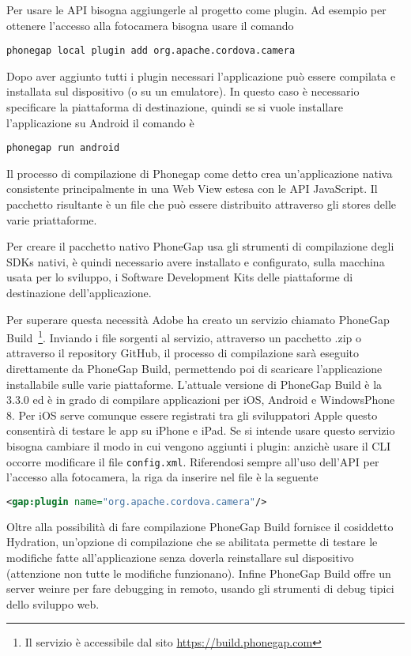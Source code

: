 			Per usare le API bisogna aggiungerle al progetto come plugin. Ad 
			esempio per ottenere l'accesso alla fotocamera bisogna usare il comando 
	\begin{lstlisting}[language=MyBash]
	phonegap local plugin add org.apache.cordova.camera
	\end{lstlisting}
	
			Dopo aver aggiunto tutti i plugin necessari l'applicazione può 
			essere compilata e installata sul dispositivo (o su un emulatore).
			In questo caso è necessario specificare la piattaforma di destinazione, 
			quindi se si vuole installare l'applicazione su Android il comando è 
	\begin{lstlisting}[language=MyBash]
	phonegap run android
	\end{lstlisting}
	
			Il processo di compilazione di Phonegap come detto 
			crea un'applicazione nativa consistente principalmente in una 
			Web View estesa con le API JavaScript. Il pacchetto 
			risultante è un file che può essere distribuito attraverso gli stores
			delle varie priattaforme.
			
			Per creare il pacchetto nativo PhoneGap usa gli strumenti di compilazione 
			degli SDKs nativi, è quindi necessario avere installato e configurato, 
			sulla macchina 
			usata per lo sviluppo, i Software Development Kits delle piattaforme 
			di destinazione dell'applicazione.
			
			Per superare questa necessità Adobe ha creato un servizio chiamato 
			PhoneGap Build~\footnote{Il servizio è accessibile dal sito 
			\url{https://build.phonegap.com}}. 
			Inviando i file sorgenti al servizio, attraverso un 
			pacchetto .zip o attraverso il repository GitHub, il processo di 
			compilazione sarà eseguito direttamente da PhoneGap Build, permettendo 
			poi di scaricare l'applicazione installabile sulle varie piattaforme.
			L'attuale versione di PhoneGap Build è la 3.3.0 ed è in grado di compilare 
			applicazioni per iOS, Android e WindowsPhone 8. Per iOS serve comunque 
			essere registrati tra gli sviluppatori Apple questo consentirà di 
			testare le app su iPhone e iPad.
			Se si intende usare questo servizio bisogna cambiare il modo in cui 
			vengono aggiunti i plugin: anzichè usare il CLI occorre modificare 
			il file \verb|config.xml|. Riferendosi sempre all'uso dell'API per 
			l'accesso alla fotocamera, la riga da inserire nel file è la seguente
	\begin{lstlisting}[language=XML]
	<gap:plugin name="org.apache.cordova.camera"/>
	\end{lstlisting} 
			Oltre alla possibilità di fare compilazione PhoneGap Build fornisce 
			il cosiddetto Hydration, un'opzione di compilazione che se abilitata 
			permette di testare le modifiche fatte all'applicazione senza doverla 
			reinstallare sul dispositivo (attenzione non tutte le modifiche 
			funzionano). Infine PhoneGap Build offre un server weinre per fare 
			debugging in remoto, usando gli strumenti di debug tipici dello 
			sviluppo web.
			 
